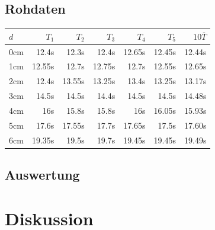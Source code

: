 \documentclass[12pt,a4paper]{article}
\begin{document}
\subsection*{Rohdaten}
\begin{tabular}{|l|r|r|r|r|r|r|}
\hline
$d$&$T_1$&$T_2$&$T_3$&$T_4$&$T_5$&$10\overline{T}$\\
\hline
0cm&12.4s&12.3s&12.4s&12.65s&12.45s&12.44s\\
1cm&12.55s&12.7s&12.75s&12.7s&12.55s&12.65s\\
2cm&12.4s&13.55s&13.25s&13.4s&13.25s&13.17s\\
3cm&14.5s&14.5s&14.4s&14.5s&14.5s&14.48s\\
4cm&16s&15.8s&15.8s&16s&16.05s&15.93s\\
5cm&17.6s&17.55s&17.7s&17.65s&17.5s&17.60s\\
6cm&19.35s&19.5s&19.7s&19.45s&19.45s&19.49s\\
\hline
\end{tabular}

\subsection*{Auswertung}


\section*{Diskussion}
\end{document}
